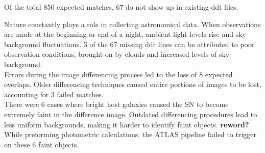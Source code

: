 
Of the total 850 expected matches, 67 do not show up in existing ddt files. 


Nature constantly plays a role in collecting astronomical data. When 
observations are made at the beginning or end of a night, ambient light 
levels rise and sky background fluctuations. 3 of the 67 missing ddt 
lines can be attributed to poor observation conditions, brought on by 
clouds and increased levels of sky background.\\


\indent Errors during the image differencing process led to the loss of 8 
expected overlaps. Older differencing techniques caused entire portions 
of images to be lost, accounting for 3 failed matches.\\

\indent There were 6 cases where bright host galaxies caused the SN to become extremely 
faint in the difference image. Outdated differencing procedures lead to less 
uniform backgrounds, making it harder to identify faint objects. {\bf reword?} 
While preforming photometric calculations, the ATLAS pipeline failed to trigger 
on these 6 faint objects.


